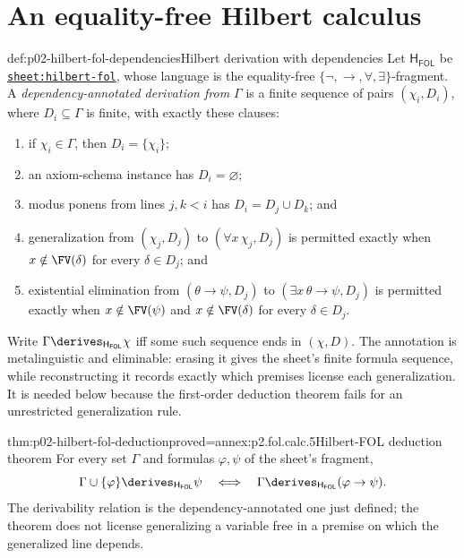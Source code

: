 \section{An equality-free Hilbert calculus}
\label{sec:p02-hilbert-fol}

\begin{hbdefinition}{def:p02-hilbert-fol-dependencies}{Hilbert derivation with dependencies}
Let \(\mathsf H_{\mathsf{FOL}}\) be
\hyperref[sheet:hilbert-fol]{\texttt{sheet:hilbert-fol}}, whose language is
the equality-free \(\{\neg,\to,\forall,\exists\}\)-fragment.  A
\emph{dependency-annotated derivation from \(\Gamma\)}
 is a finite sequence
of pairs \((\chi_i,D_i)\), where \(D_i\subseteq\Gamma\) is finite, with
exactly these clauses:
\begin{enumerate}
  \item if \(\chi_i\in\Gamma\), then \(D_i=\{\chi_i\}\);
  \item an axiom-schema instance has \(D_i=\varnothing\);
  \item modus ponens from lines \(j,k<i\) has
        \(D_i=D_j\cup D_k\); and
  \item generalization from \((\chi_j,D_j)\) to
        \((\forall x\,\chi_j,D_j)\) is permitted exactly when
        \(x\notin\FV(\delta)\) for every \(\delta\in D_j\); and
  \item existential elimination from
        \((\theta\to\psi,D_j)\) to
        \((\exists x\,\theta\to\psi,D_j)\) is permitted exactly when
        \(x\notin\FV(\psi)\) and
        \(x\notin\FV(\delta)\) for every \(\delta\in D_j\).
\end{enumerate}
Write \(\Gamma\derives_{\mathsf H_{\mathsf{FOL}}}\chi\) iff some such
sequence ends in \((\chi,D)\).  The annotation is metalinguistic and
eliminable: erasing it gives the sheet's finite formula sequence, while
reconstructing it records exactly which premises license each generalization.
It is needed below because the first-order deduction theorem fails for an
unrestricted generalization rule.
\end{hbdefinition}

\begin{hbtheorem}{thm:p02-hilbert-fol-deduction}{proved=annex:p2.fol.calc.5}{Hilbert-FOL deduction theorem}
For every set \(\Gamma\) and formulas \(\varphi,\psi\) of the sheet's
fragment,
\[
 \Gamma\cup\{\varphi\}
   \derives_{\mathsf H_{\mathsf{FOL}}}\psi
 \quad\Longleftrightarrow\quad
 \Gamma\derives_{\mathsf H_{\mathsf{FOL}}}(\varphi\to\psi).
\]
The derivability relation is the dependency-annotated one just defined; the
theorem does not license generalizing a variable free in a premise on which
the generalized line depends.
\end{hbtheorem}

